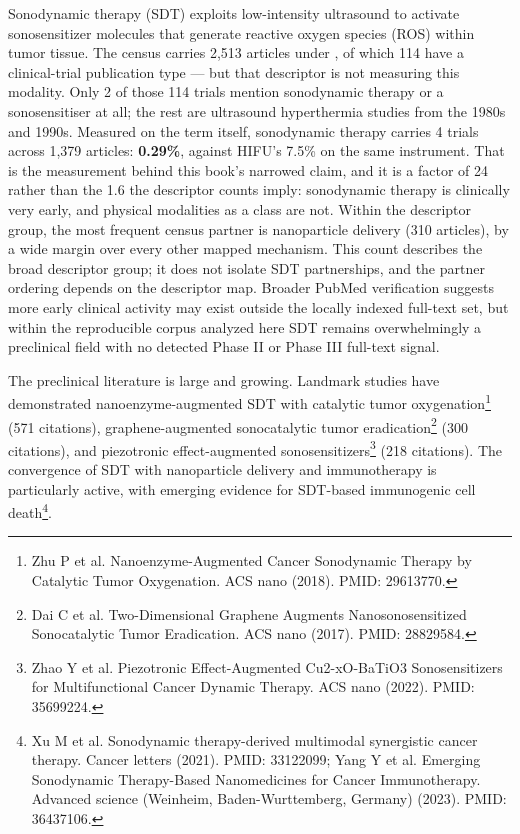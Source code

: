\documentclass[11pt,twoside,openright]{report}
\begin{document}
Sonodynamic therapy (SDT) exploits low-intensity ultrasound to activate sonosensitizer molecules that generate reactive oxygen species (ROS) within tumor tissue. The census carries 2,513 articles under , of which 114 have a clinical-trial publication type --- but that descriptor is not measuring this modality. Only 2 of those 114 trials mention sonodynamic therapy or a sonosensitiser at all; the rest are ultrasound hyperthermia studies from the 1980s and 1990s. Measured on the term itself, sonodynamic therapy carries 4 trials across 1,379 articles: \textbf{0.29\%}, against HIFU's 7.5\% on the same instrument. That is the measurement behind this book's narrowed claim, and it is a factor of 24 rather than the 1.6 the descriptor counts imply: sonodynamic therapy is clinically very early, and physical modalities as a class are not. Within the  descriptor group, the most frequent census partner is nanoparticle delivery (310 articles), by a wide margin over every other mapped mechanism. This count describes the broad descriptor group; it does not isolate SDT partnerships, and the partner ordering depends on the descriptor map. Broader PubMed verification suggests more early clinical activity may exist outside the locally indexed full-text set, but within the reproducible corpus analyzed here SDT remains overwhelmingly a preclinical field with no detected Phase II or Phase III full-text signal.

The preclinical literature is large and growing. Landmark studies have demonstrated nanoenzyme-augmented SDT with catalytic tumor oxygenation\footnote{Zhu P et al. Nanoenzyme-Augmented Cancer Sonodynamic Therapy by Catalytic Tumor Oxygenation. ACS nano (2018). PMID: 29613770.} (571 citations), graphene-augmented sonocatalytic tumor eradication\footnote{Dai C et al. Two-Dimensional Graphene Augments Nanosonosensitized Sonocatalytic Tumor Eradication. ACS nano (2017). PMID: 28829584.} (300 citations), and piezotronic effect-augmented sonosensitizers\footnote{Zhao Y et al. Piezotronic Effect-Augmented Cu2-xO-BaTiO3 Sonosensitizers for Multifunctional Cancer Dynamic Therapy. ACS nano (2022). PMID: 35699224.} (218 citations). The convergence of SDT with nanoparticle delivery and immunotherapy is particularly active, with emerging evidence for SDT-based immunogenic cell death\footnote{Xu M et al. Sonodynamic therapy-derived multimodal synergistic cancer therapy. Cancer letters (2021). PMID: 33122099; Yang Y et al. Emerging Sonodynamic Therapy-Based Nanomedicines for Cancer Immunotherapy. Advanced science (Weinheim, Baden-Wurttemberg, Germany) (2023). PMID: 36437106.}.
\end{document}
